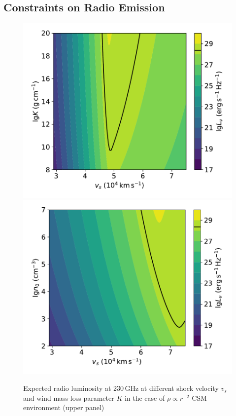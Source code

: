 \documentclass[twocolumn]{aastex63}
\begin{document}
\begin{CJK*}{UTF8}{gbsn}
\subsection{Constraints on Radio Emission}
\begin{figure}
	\centering
	\includegraphics[width=\columnwidth]{figures/radio_230GHz_s2.pdf}
	\includegraphics[width=\columnwidth]{figures/radio_230GHz_s0.pdf}
	\caption{Expected radio luminosity at 230\,GHz at different shock velocity $v_s$ and 
	wind mass-loss parameter $K$ in the case of $\rho \propto r^{-2}$ CSM environment (upper panel) 
}
\end{figure}
\end{CJK*}
\end{document}
